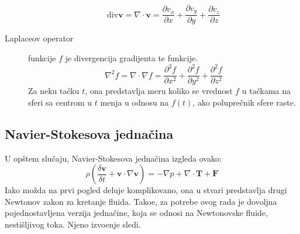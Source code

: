 \documentclass[12pt]{article}
\renewcommand{\vec}[1]{\mathbf{#1}}
\begin{document}
\begin{description}
                \begin{equation}\label{eq:definicija divergencije}
                \text{div} \vec{v} = \nabla \cdot \vec{v} = \frac{\partial v_x}{\partial x} + \frac{\partial v_y}{\partial y} + \frac{\partial v_z}{\partial z}
                \end{equation}
          \item[Laplaceov operator] funkcije $f$ je divergencija gradijenta te funkcije.
          \begin{equation}\label{eq:definicija laplaceovog operatora}
          \nabla^2 f = \nabla\cdot\nabla f = \frac{\partial^2 f}{\partial x^2} + \frac{\partial^2 f}{\partial y^2} + \frac{\partial^2 f}{\partial z^2}
          \end{equation}
              Za neku ta\v cku $t$, ona predstavlja meru koliko se vrednost $f$ u ta\v ckama na sferi sa centrom u $t$ menja u odnosu na $f(t)$, ako polupre\v cnik sfere raste.
        \end{description}
    \subsection{Navier-Stokesova jedna\v cina} \label{Navier Stokes}
        U op\v stem slu\v caju, Navier-Stokesova jedna\v cina izgleda ovako:
        \begin{equation}\label{eq:Navier-Stokes opsti slucaj}
            \rho(\frac{\delta \vec{v}}{\delta t} + \vec{v} \cdot \nabla \vec{v}) = -\nabla p + \nabla \cdot \vec{T} + \vec{F}
        \end{equation}
        Iako mo\v zda na prvi pogled deluje komplikovano, ona u stvari predstavlja drugi Newtonov zakon za kretanje fluida. Tako\dj e, za potrebe ovog rada je dovoljna pojednostavljena verzija jedna\v cine, koja se odnosi na Newtonovske fluide, nesti\v sljivog toka. Njeno izvo\dj enje sledi.
\end{document}
